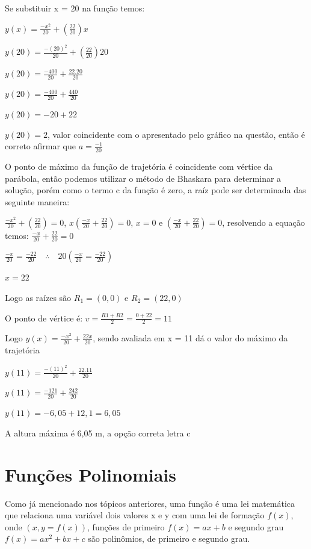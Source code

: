 \begin{multicols*}{2}
    Se substituir x = 20 na função temos:

    $y(x) = \frac{-x^2}{20} + \left(  \frac{22 }{20} \right)x$

    $y(20) = \frac{-(20)^2}{20} + \left(  \frac{22 }{20} \right)20$

    $y(20) = \frac{-400}{20} + \frac{22 . 20}{20}$

    $y(20) = \frac{-400}{20} + \frac{440}{20}$

    $y(20) = -20 + 22$

    $y(20) = 2$, valor coincidente com o apresentado pelo gráfico na questão, então é correto 				afirmar que $a = \frac{-1}{20}$

    O ponto de máximo da função de trajetória é coincidente com vértice da parábola, então podemos 			utilizar o método de Bhaskara para determinar a solução, porém como o termo c da função é zero, 			a raíz pode ser determinada das seguinte maneira:

    $\frac{-x^2}{20} + \left(  \frac{22 }{20} \right) = 0$,
    $x \left(    \frac{-x}{20} + \frac{22}{20} \right) = 0$,
    $x = 0$ e $\left(    \frac{-x}{20} + \frac{22}{20} \right) = 0$, resolvendo a equação temos:
    $    \frac{-x}{20} + \frac{22}{20}  = 0$

    $\frac{-x}{20} = \frac{- 22}{20} \quad \therefore \quad
        20 \left( \frac{-x}{20} = \frac{- 22}{20} \right)$

    $x = 22$

    Logo as raízes são $R_1 = (0,0)$ e $R_2 = (22,0)$

    O ponto de vértice é: $v =\frac{R1 + R2}{2} =\frac{0 + 22}{2} = 11 $

    Logo $y(x) = \frac{-x^2}{20} + \frac{22x}{20}$, sendo avaliada em x = 11 dá o valor do máximo 			da trajetória

    $y(11) = \frac{-(11)^2}{20} + \frac{22.11}{20} $

    $y(11) = \frac{-121}{20} + \frac{242}{20} $

    $y(11) = -6,05 + 12,1  = 6,05 $

    A altura máxima é 6,05 m, a opção correta letra c


    \section*{Funções Polinomiais}
    Como já mencionado nos tópicos anteriores, uma função é uma lei matemática que relaciona uma 			variável dois valores x e y com uma lei de formação $f(x)$, onde $(x, y = f(x))$, funções de 			primeiro $f(x) = ax + b$ e segundo grau $f(x) = ax^2 + bx + c$ são polinômios, de primeiro e 			segundo grau.


\end{multicols*}
